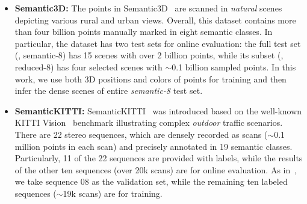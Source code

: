\documentclass[10pt,twocolumn,letterpaper]{article}
\begin{document}
\begin{itemize}
\begin{table*}
\begin{center}
{\begin{tabular}{c c c c c c c c c c c c c c c c c c c c c}
RandLA-Net~\cite{hu2020randla} &53.9&90.7&73.7&60.3&20.4&86.9&94.2&40.1&26.0&25.8&38.9&81.4&61.3&66.8&49.2&48.2&7.2&56.3&49.2&47.7\\
PolarNet~\cite{zhang2020polarnet} &54.3&90.8&74.4&61.7&21.7&90.0&93.8&22.9&40.3&30.1&28.5&84.0&65.5&67.8&43.2&40.2&5.6&67.8&51.8&57.5\\
MinkNet42~\cite{choy20194d} &54.3 &91.1 &69.7 &63.8 &29.3 &\textbf{92.7} &94.3 &26.1 &23.1 &26.2 &36.7 &83.7 &68.4 &64.7 &43.1 &36.4 &7.9 &57.1 &57.3 &60.1\\
FusionNet~\cite{zhang2020deep} &\textbf{61.3} &\textbf{91.8} &\textbf{77.1} &\textbf{68.8} &\textbf{30.8} &92.5 &95.3 &41.8 &\textbf{47.5} &\textbf{37.7} &34.5 &\textbf{84.5} &\textbf{69.8} &68.5 &\textbf{59.5} &56.8 &11.9 &\textbf{69.4} &\textbf{60.4} &\textbf{66.5}\\
\hline
\textbf{Ours}  &59.9&90.9&74.4&62.2&23.6&89.8&\textbf{95.4}&\textbf{48.7}&31.8&35.5&\textbf{46.7}&82.7&63.4&67.9&49.5&55.7&\textbf{53.0}&60.8&53.7&52.0   \\ \Xhline{3\arrayrulewidth}
\end{tabular}
\label{tab:kitti}
}
\end{center}
\vspace{-3mm}
\end{table*}
 
 \item \textbf{Semantic3D:}  
The points in Semantic3D~\cite{hackel2017semantic3d} are scanned in \emph{natural} scenes depicting various rural and urban views. Overall, this dataset contains more than four billion points manually marked in eight semantic classes. In particular, the dataset has two test sets for online evaluation: the full test set (\ie, semantic-8) has 15 scenes with over 2 billion points, while its subset (\ie, reduced-8) has four selected scenes with $\sim$0.1 billion sampled points. In this work, we use both 3D positions and colors of points for training and then infer the dense scenes of entire \emph{semantic-8} test set. 

 \item \textbf{SemanticKITTI:} 
SemanticKITTI~\cite{behley2019semantickitti} was introduced based on the well-known KITTI Vision~\cite{Geiger2012CVPR} benchmark illustrating complex \emph{outdoor} traffic scenarios. There are 22 stereo sequences, which are densely recorded as scans ($\sim$0.1 million points in each scan) and precisely annotated in 19 semantic classes. Particularly, 11 of the 22 sequences are provided with labels, while the results of the other ten sequences (over 20k scans) are for online evaluation. As in~\cite{behley2019semantickitti}, we take sequence 08 as the validation set, while the remaining ten labeled sequences ($\sim$19k scans) are for training.
\end{itemize}
\end{document}
